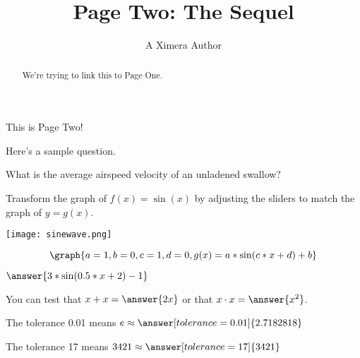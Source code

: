 \documentclass{ximera}
\title{Page Two: The Sequel}
\author{A Ximera Author}
\begin{document}
\begin{abstract}
We're trying to link this to Page One.
\end{abstract}
\maketitle

This is Page Two!

Here's a sample question.

\begin{problem}
\begin{multipleChoice}
\end{multipleChoice}
\end{problem}

What is the average airspeed velocity of an unladened swallow?

\begin{problem}
\begin{multipleChoice}
\end{multipleChoice}
\end{problem}

\begin{problem}
Transform the graph of $f(x) = \sin(x)$ by adjusting the sliders to match the graph of $y = g(x)$.

\begin{image}
\texttt{[image: sinewave.png]}
\end{image}

\[\graph{a = 1, b = 0, c = 1,d = 0,g(x) = a*\sin(c*x + d)+b} \]

$\answer{3*\sin(0.5*x + 2) - 1}$
\end{problem}

\begin{problem}
   You can test that $x + x = \answer{2x}$ or that $x \cdot x = \answer{x^2}$.
\end{problem}

\begin{problem}
   The tolerance 0.01 means $e \approx \answer[tolerance=0.01]{2.7182818}$
\end{problem}

\begin{problem}
   The tolerance 17 means $3421 \approx \answer[tolerance=17]{3421}$
\end{problem}
\end{document}
